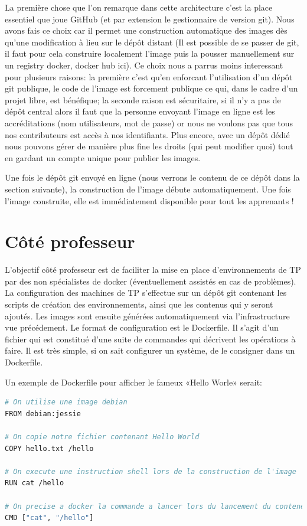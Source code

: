 \documentclass[a4paper,11pt]{report}
\begin{document}
La première chose que l'on remarque dans cette architecture c'est la place essentiel que joue GitHub (et par extension le gestionnaire de version git). Nous avons fais ce choix car il permet une construction automatique des images dès qu'une modification à lieu sur le dépôt distant (Il est possible de se passer de git, il faut pour cela construire localement l'image puis la pousser manuellement sur un registry docker, docker hub ici). Ce choix nous a parrus moins interessant pour plusieurs raisons: la première c'est qu'en enforcant l'utilisation d'un dépôt git publique, le code de l'image est forcement publique ce qui, dans le cadre d'un projet libre, est bénéfique; la seconde raison est sécuritaire, si il n'y a pas de dépôt central alors il faut que la personne envoyant l'image en ligne est les accréditations (nom utilisateurs, mot de passe) or nous ne voulons pas que tous nos contributeurs est accès à nos identifiants. Plus encore, avec un dépôt dédié nous pouvons gérer de manière plus fine les droits (qui peut modifier quoi) tout en gardant un compte unique pour publier les images.

Une fois le dépôt git envoyé en ligne (nous verrons le contenu de ce dépôt dans la section suivante), la construction de l'image débute automatiquement. Une fois l'image construite, elle est immédiatement disponible pour tout les apprenants !

\section{Côté professeur}

L'objectif côté professeur est de faciliter la mise en place d'environnements de TP par des non spécialistes de docker (éventuellement assistés en cas de problèmes).
La configuration des machines de TP s'effectue sur un dépôt git contenant les scripts de création des environnements, ainsi que les contenus qui y seront ajoutés. Les images sont ensuite générées automatiquement via l'infrastructure vue précédement.
Le format de configuration est le Dockerfile. Il s'agit d'un fichier qui est constitué d'une suite de commandes qui décrivent les opérations à faire. Il est très simple, si on sait configurer un système, de le consigner dans un Dockerfile.

Un exemple de Dockerfile pour afficher le fameux «Hello Worle» serait:

\begin{lstlisting}[language=Bash,caption={Dockerfile Hello World}]
# On utilise une image debian
FROM debian:jessie

# On copie notre fichier contenant Hello World
COPY hello.txt /hello

# On execute une instruction shell lors de la construction de l'image
RUN cat /hello

# On precise a docker la commande a lancer lors du lancement du conteneur
CMD ["cat", "/hello"]
\end{lstlisting}
\end{document}
